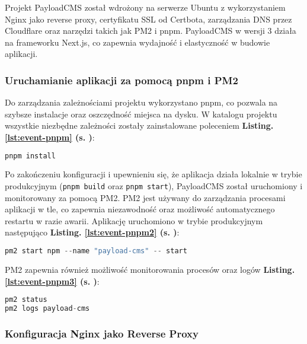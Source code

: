 Projekt PayloadCMS\cite{github-backend} został wdrożony na serwerze Ubuntu\cite{backend} z wykorzystaniem Nginx jako reverse proxy, certyfikatu SSL od Certbota, zarządzania DNS przez Cloudflare oraz narzędzi takich jak PM2 i pnpm. PayloadCMS w wersji 3 działa na frameworku Next.js, co zapewnia wydajność i elastyczność w budowie aplikacji.

\subsubsection{Uruchamianie aplikacji za pomocą pnpm i PM2}

Do zarządzania zależnościami projektu wykorzystano pnpm, co pozwala na szybsze instalacje oraz oszczędność miejsca na dysku. W katalogu projektu wszystkie niezbędne zależności zostały zainstalowane poleceniem \textbf{Listing. \ref{lst:event-pnpm} (s. \pageref{lst:event-pnpm})}:
\begin{lstlisting}[language=C++, caption=Instalacja pnpm,  label={lst:event-pnpm}]
pnpm install
\end{lstlisting}

Po zakończeniu konfiguracji i upewnieniu się, że aplikacja działa lokalnie w trybie produkcyjnym (\texttt{pnpm build} oraz \texttt{pnpm start}), PayloadCMS został uruchomiony i monitorowany za pomocą PM2. PM2 jest używany do zarządzania procesami aplikacji w tle, co zapewnia niezawodność oraz możliwość automatycznego restartu w razie awarii. Aplikację uruchomiono w trybie produkcyjnym następująco \textbf{Listing. \ref{lst:event-pnpm2} (s. \pageref{lst:event-pnpm2})}:
\begin{lstlisting}[language=C++, caption=Uruchamianie pnpm,  label={lst:event-pnpm2}]
pm2 start npm --name "payload-cms" -- start
\end{lstlisting}

PM2 zapewnia również możliwość monitorowania procesów oraz logów \textbf{Listing. \ref{lst:event-pnpm3} (s. \pageref{lst:event-pnpm3})}:
\begin{lstlisting}[language=C++, caption=Sprawdzenie status oraz logów przy pomocy pnpm,  label={lst:event-pnpm3}]
pm2 status
pm2 logs payload-cms
\end{lstlisting}

\subsubsection{Konfiguracja Nginx jako Reverse Proxy}

